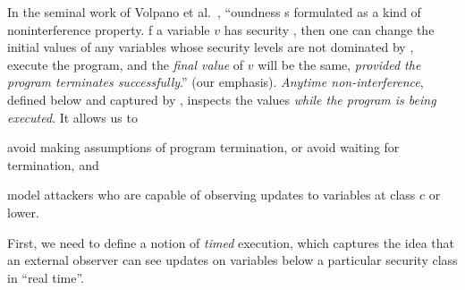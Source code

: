In the seminal work of Volpano et al.~\cite[pg.~173]{VolpanoI1996}, \enquote{oundness s formulated as a kind of noninterference property. f a variable $v$ has security %
, then one can change the initial values of any variables whose security levels are not dominated by %
, execute the program, and
the \emph{final value} of $v$ will be the same, \emph{provided the program terminates successfully}.} (our emphasis).
\emph{Anytime non-interference}, defined below and captured by \lname, inspects the values \emph{while the program is being executed}.
It allows us to \begin{enumerate*}
\item avoid making assumptions of program termination, or avoid waiting for termination, and
\item model attackers who are capable of observing updates to variables at class $c$ or lower.
\end{enumerate*}

First, we need to define a notion of \emph{timed} execution, which captures the idea that an external observer can see updates on variables below a particular security class in \enquote{real time}.




